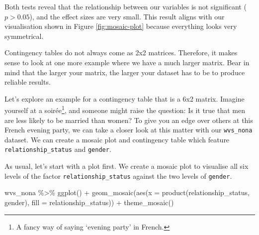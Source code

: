 \documentclass[
]{book}
\newenvironment{Shaded}{\begin{snugshade}}{\end{snugshade}}
\newcommand{\AttributeTok}[1]{\textcolor[rgb]{0.77,0.63,0.00}{#1}}
\newcommand{\DocumentationTok}[1]{\textcolor[rgb]{0.56,0.35,0.01}{\textbf{\textit{#1}}}}
\newcommand{\FunctionTok}[1]{\textcolor[rgb]{0.00,0.00,0.00}{#1}}
\newcommand{\NormalTok}[1]{#1}
\newcommand{\OtherTok}[1]{\textcolor[rgb]{0.56,0.35,0.01}{#1}}
\newcommand{\SpecialCharTok}[1]{\textcolor[rgb]{0.00,0.00,0.00}{#1}}
\newcommand{\StringTok}[1]{\textcolor[rgb]{0.31,0.60,0.02}{#1}}
\begin{document}
\begin{Shaded}
\end{Shaded}

Both tests reveal that the relationship between our variables is not significant (\(p > 0.05\)), and the effect sizes are very small. This result aligns with our visualisation shown in Figure \ref{fig:mosaic-plot} because everything looks very symmetrical.

Contingency tables do not always come as 2x2 matrices. Therefore, it makes sense to look at one more example where we have a much larger matrix. Bear in mind that the larger your matrix, the larger your dataset has to be to produce reliable results.

Let's explore an example for a contingency table that is a 6x2 matrix. Imagine yourself at a soirée\footnote{A fancy way of saying `evening party' in French.}, and someone might raise the question: Is it true that men are less likely to be married than women? To give you an edge over others at this French evening party, we can take a closer look at this matter with our \texttt{wvs\_nona} dataset. We can create a mosaic plot and contingency table which feature \texttt{relationship\_status} and \texttt{gender}.

As usual, let's start with a plot first. We create a mosaic plot to visualise all six levels of the factor \texttt{relationship\_status} against the two levels of \texttt{gender}.

\begin{Shaded}
\begin{Highlighting}[]
\NormalTok{wvs\_nona }\SpecialCharTok{\%\textgreater{}\%}
  \FunctionTok{ggplot}\NormalTok{() }\SpecialCharTok{+}
  \FunctionTok{geom\_mosaic}\NormalTok{(}\FunctionTok{aes}\NormalTok{(}\AttributeTok{x =} \FunctionTok{product}\NormalTok{(relationship\_status, gender),}
                  \AttributeTok{fill =}\NormalTok{ relationship\_status)) }\SpecialCharTok{+}
  \FunctionTok{theme\_mosaic}\NormalTok{()}
\end{Highlighting}
\end{Shaded}
\end{document}
